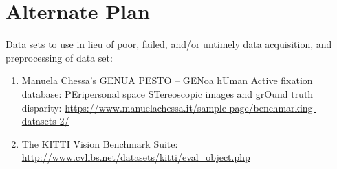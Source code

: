 \documentclass[letter,12pt]{article}
\begin{document}
\section{Alternate Plan}
\label{sec:AlternatePlan}

Data sets to use in lieu of poor, failed, and/or untimely data acquisition, and preprocessing of data set: \vspace{-0.3cm}
\begin{enumerate} \itemsep -4pt
\item Manuela Chessa's GENUA PESTO -- GENoa hUman Active fixation database: PEripersonal space STereoscopic images and grOund truth disparity: \url{https://www.manuelachessa.it/sample-page/benchmarking-datasets-2/}
\item The KITTI Vision Benchmark Suite: \url{http://www.cvlibs.net/datasets/kitti/eval_object.php}
\end{enumerate}









%
%
%

{\linespread{1}


}
\end{document}
